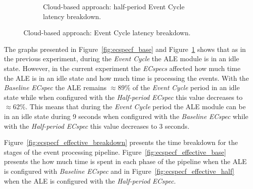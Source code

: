\begin{figure}[ht!]
\begin{subfigure}{.5\textwidth}
    \caption{Cloud-based approach: half-period Event Cycle\\latency breakdown.}
    \label{fig:ecspecf_half}
  \end{subfigure}
  \caption{Cloud-based approach: Event Cycle latency breakdown.}
  \label{fig:ecspecf_breakdown}
\end{figure}

The graphs presented in Figure~\ref{fig:ecspecf_base} and Figure~\ref{fig:ecspecf_half} shows that
as in the previous experiment, during the \textit{Event Cycle} the \gls{ALE} module is in an idle state.
However, in the current experiment the \textit{ECspecs} affected how much time the \gls{ALE} is in an
idle state and how much time is processing the events. With the \textit{Baseline ECspec} the \gls{ALE}
remains $\approx89\%$ of the \textit{Event Cycle} period in an idle state while when configured with
the \textit{Half-period ECspec} this value decreases to $\approx62\%$. This means that during the \textit{Event Cycle}
period the \gls{ALE} module can be in an idle state during 9 seconds when configured with the
\textit{Baseline ECspec} while with the \textit{Half-period ECspec} this value decreases to 3 seconds.\\

\pagebreak

Figure~\ref{fig:ecspecf_effective_breakdown} presents the time breakdown for the stages of the
event processing pipeline. Figure~\ref{fig:ecspecf_effective_base} presents the how much time is spent
in each phase of the pipeline when the \gls{ALE} is configured with \textit{Baseline ECspec} and in
Figure~\ref{fig:ecspecf_effective_half} when the \gls{ALE} is configured with the \textit{Half-period ECspec}.\\

